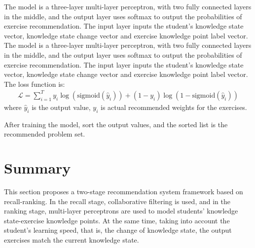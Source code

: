 The model is a three-layer multi-layer perceptron, with two fully connected layers in the middle, and the output layer uses softmax to output the probabilities of exercise recommendation. The input layer inputs the student's knowledge state vector, knowledge state change vector and exercise knowledge point label vector. The model is a three-layer multi-layer perceptron, with two fully connected layers in the middle, and the output layer uses softmax to output the probabilities of exercise recommendation. The input layer inputs the student's knowledge state vector, knowledge state change vector and exercise knowledge point label vector. The loss function is:
\begin{align}
\mathcal{L}=\sum_{i=1}^{T} y_i \log \left(\text{sigmoid}\left(\hat{y}_i\right)\right)+\left(1-y_i \right) \log (1-\text{sigmoid}(\hat{y}_i))
\end{align}
where $\hat{y}_i$ is the output value, $y_i$ is actual recommended weights for the exercises.

After training the model, sort the output values, and the sorted list is the recommended problem set.


\section{Summary}
This section proposes a two-stage recommendation system framework based on recall-ranking. In the recall stage, collaborative filtering is used, and in the ranking stage, multi-layer perceptrons are used to model students' knowledge state-exercise knowledge points. At the same time, taking into account the student’s learning speed, that is, the change of knowledge state, the output exercises match the current knowledge state.